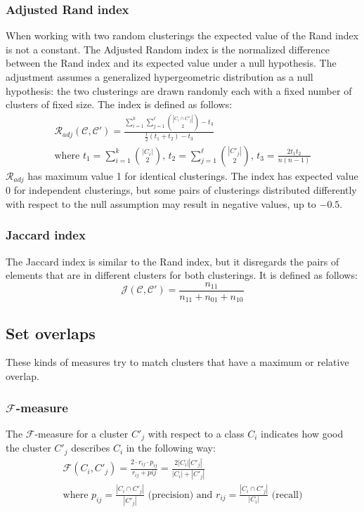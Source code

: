 \subsubsection{Adjusted Rand index}
When working with two random clusterings the expected value of the Rand index is not a constant. The Adjusted Random index is the normalized difference between the Rand index and its expected value under a null hypothesis. The adjustment assumes a generalized hypergeometric distribution as a null hypothesis: the two clusterings are drawn randomly each with a fixed number of clusters of fixed size. 
The index is defined as follows:
\begin{equation*}
    \begin{gathered}
       \mathcal{R}_{adj}(\mathcal{C},\mathcal{C}')=\frac{\sum_{i=1}^k\sum_{j=1}^\ell\binom{|C_i\cap C'_j|}{2}-t_3}{\frac{1}{2}(t_1+t_2)-t_3} \\
       \text{where } t_1=\sum_{i=1}^k\binom{|C_i|}{2}\text{, }t_2=\sum_{j=1}^\ell\binom{|C'_j|}{2}\text{, }t_3=\frac{2t_1t_2}{n(n-1)}
    \end{gathered}    
\end{equation*}
$\mathcal{R}_{adj}$ has maximum value 1 for identical clusterings. The index has expected value 0 for independent clusterings, but some pairs of clusterings distributed differently with respect to the null assumption may result in negative values, up to $-0.5$.

\subsubsection{Jaccard index}
The Jaccard index is similar to the Rand index, but it disregards the pairs of elements that are in different clusters for both clusterings. It is defined as follows:
\begin{equation*}
    \mathcal{J}(\mathcal{C},\mathcal{C}')=\frac{n_{11}}{n_{11}+n_{01}+n_{10}}
\end{equation*}

\subsection{Set overlaps}
These kinds of measures try to match clusters that have a maximum or relative overlap.

\subsubsection{$\mathcal{F}$-measure}
The $\mathcal{F}$-measure for a cluster $C'_j$ with respect to a class $C_i$ indicates how good the cluster $C'_j$ describes $C_i$ in the following way:
\begin{equation*}
    \begin{gathered}
        \mathcal{F}(C_i,C'_j)=\frac{2\cdot r_{ij}\cdot p_{ij}}{r_{ij}+p{ij}}=\frac{2|C_i||C'_j|}{|C_i|+|C'_j|}\\
        \text{where }p_{ij}=\frac{|C_i\cap C'_j|}{|C'_j|} \text{ (precision) and } r_{ij}=\frac{|C_i\cap C'_j|}{|C_i|} \text{ (recall)}
    \end{gathered}
\end{equation*}

